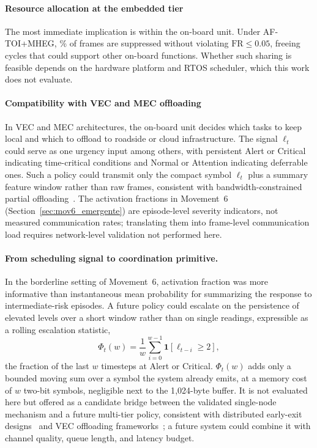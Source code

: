 \documentclass[a4paper,fleqn]{cas-dc}
\begin{document}
\paragraph{Resource allocation at the embedded tier}
The most immediate implication is within the on-board unit. Under \mbox{AF-TOI}+MHEG,
{\color{\revcolor}\SkipRate\%} of frames are suppressed without violating $\mathrm{FR} \le 0.05$,
freeing cycles that could support other on-board functions. Whether such sharing
is feasible depends on the hardware platform and RTOS scheduler, which this work
does not evaluate.
\paragraph{Compatibility with VEC and MEC offloading}
In VEC and MEC architectures, the on-board unit decides which tasks to keep
local and which to offload to roadside or cloud infrastructure. The signal
$\ell_t$ could serve as one urgency input among others, with persistent Alert or
Critical indicating time-critical conditions and Normal or Attention indicating
deferrable ones. Such a policy could transmit only the compact symbol $\ell_t$
plus a summary feature window rather than raw frames, consistent with
bandwidth-constrained partial offloading~\cite{uddin2025taskoffloading}. The
activation fractions in Movement~6 (Section~\ref{sec:mov6_emergente}) are
episode-level severity indicators, not measured communication rates; translating
them into frame-level communication load requires network-level validation not
performed here.
\paragraph{From scheduling signal to coordination primitive.}
In the borderline setting of Movement~6, activation fraction was more
informative than instantaneous mean probability for summarizing the response to
intermediate-risk episodes. A future policy could escalate on the persistence of
elevated levels over a short window rather than on single readings, expressible
as a rolling escalation statistic,
\begin{equation}
  \Phi_t(w) = \frac{1}{w}\sum_{i=0}^{w-1} \mathbf{1}\!\left[\ell_{t-i}
  \ge 2\right],
  \label{eq:escalation}
\end{equation}
the fraction of the last $w$ timesteps at Alert or Critical. $\Phi_t(w)$ adds
only a bounded moving sum over a symbol the system already emits, at a memory
cost of $w$ two-bit symbols, negligible next to the 1{,}024-byte buffer. It is
not evaluated here but offered as a candidate bridge between the validated
single-node mechanism and a future multi-tier policy, consistent with
distributed early-exit designs~\cite{peng2025distree} and VEC offloading
frameworks~\cite{uddin2025taskoffloading,abouali2025edgeai}; a future system
could combine it with channel quality, queue length, and latency budget.
\end{document}
